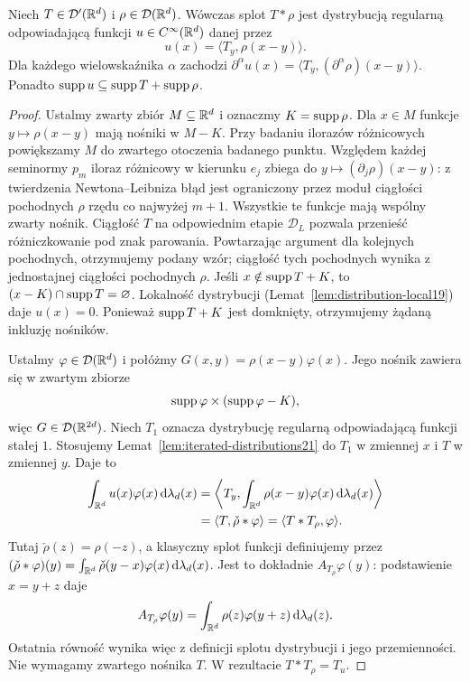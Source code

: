 \begin{twierdzenie}
\label{thm:smoothing21}
Niech $T\in\mathcal D'(\mathbb R^d)$ i
$\rho\in\mathcal D(\mathbb R^d)$. Wówczas splot
$T*\rho$ jest dystrybucją regularną odpowiadającą
funkcji $u\in C^\infty(\mathbb R^d)$ danej przez
\[
 u(x)=\langle T_y,\rho(x-y)\rangle.
\]
Dla każdego wielowskaźnika $\alpha$ zachodzi
$\partial^\alpha u(x)
=\langle T_y,(\partial^\alpha\rho)(x-y)\rangle$.
Ponadto $\operatorname{supp} u\subseteq\operatorname{supp} T+\operatorname{supp}\rho$.
\end{twierdzenie}
\begin{proof}
Ustalmy zwarty zbiór $M\subseteq\mathbb R^d$ i oznaczmy
$K=\operatorname{supp}\rho$. Dla $x\in M$ funkcje
$y\mapsto\rho(x-y)$ mają nośniki w $M-K$.
Przy badaniu ilorazów różnicowych powiększamy $M$
do zwartego otoczenia badanego punktu. Względem każdej
seminormy $p_m$ iloraz różnicowy w kierunku $e_j$
zbiega do $y\mapsto(\partial_j\rho)(x-y)$:
z twierdzenia Newtona--Leibniza błąd jest ograniczony
przez moduł ciągłości pochodnych $\rho$ rzędu co najwyżej
$m+1$. Wszystkie te funkcje mają wspólny zwarty nośnik.
Ciągłość $T$ na odpowiednim etapie $\mathcal D_L$
pozwala przenieść różniczkowanie pod znak parowania.
Powtarzając argument dla kolejnych pochodnych,
otrzymujemy podany wzór; ciągłość tych pochodnych
wynika z jednostajnej ciągłości pochodnych $\rho$.
Jeśli $x\notin\operatorname{supp} T+K$, to
$(x-K)\cap\operatorname{supp} T=\varnothing$. Lokalność dystrybucji
(Lemat~\ref{lem:distribution-local19}) daje $u(x)=0$.
Ponieważ $\operatorname{supp} T+K$ jest domknięty, otrzymujemy
żądaną inkluzję nośników.

Ustalmy $\varphi\in\mathcal D(\mathbb R^d)$ i połóżmy
$G(x,y)=\rho(x-y)\varphi(x)$. Jego nośnik zawiera się
w zwartym zbiorze
\[
 \operatorname{supp}\varphi\times(\operatorname{supp}\varphi-K),
\]
więc $G\in\mathcal D(\mathbb R^{2d})$.
Niech $T_1$ oznacza dystrybucję regularną odpowiadającą
funkcji stałej $1$. Stosujemy
Lemat~\ref{lem:iterated-distributions21} do $T_1$ w zmiennej
$x$ i $T$ w zmiennej $y$. Daje to
\[
 \begin{aligned}
 \int_{\mathbb R^d}u(x)\varphi(x)\,\mathrm d\lambda_d(x)
 &=\left\langle T_y,
      \int_{\mathbb R^d}\rho(x-y)\varphi(x)\,\mathrm d\lambda_d(x)
   \right\rangle\\
 &=\langle T,\check\rho*\varphi\rangle
 =\langle T* T_\rho,\varphi\rangle.
 \end{aligned}
\]
Tutaj $\check\rho(z)=\rho(-z)$, a klasyczny splot
funkcji definiujemy przez
$(\check\rho*\varphi)(y)=\int_{\mathbb R^d}\check\rho(y-x)
\varphi(x)\,\mathrm d\lambda_d(x)$.
Jest to dokładnie $A_{T_\rho}\varphi(y)$: podstawienie
$x=y+z$ daje
\[
 A_{T_\rho}\varphi(y)=
 \int_{\mathbb R^d}\rho(z)\varphi(y+z)\,\mathrm d\lambda_d(z).
\]
Ostatnia równość wynika więc z definicji splotu
dystrybucji i jego przemienności. Nie wymagamy
zwartego nośnika $T$. W rezultacie $T*T_\rho=T_u$.
\end{proof}

